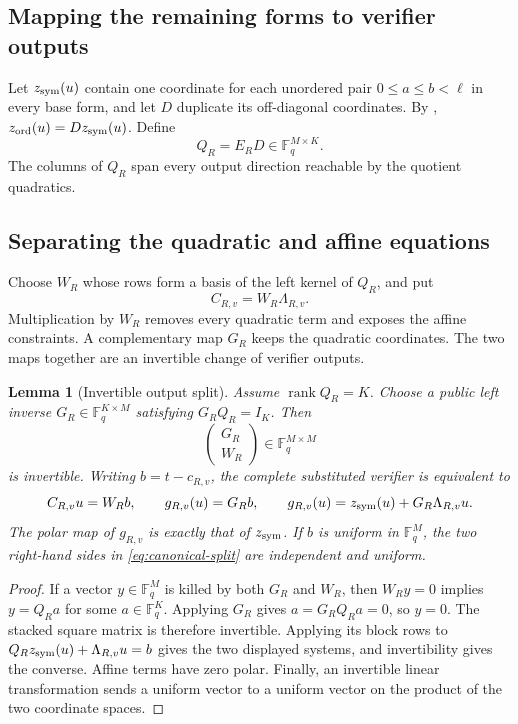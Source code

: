 \documentclass[11pt]{article}
\newtheorem{lemma}[lemma]{Lemma}
\newcommand{\F}{\mathbb F}
\newcommand{\rank}{\operatorname{rank}}
\begin{document}
\subsection{Mapping the remaining forms to verifier outputs}
Let $z_{\rm sym}(u)$ contain one coordinate for each unordered pair
$0\le a\le b<\ell$ in every base form, and let $D$ duplicate its off-diagonal
coordinates.  By ,
$z_{\rm ord}(u)=Dz_{\rm sym}(u)$.  Define
\begin{equation}
  Q_R=E_RD\in\F_q^{M\times K}.                     \label{eq:QR}
\end{equation}
The columns of $Q_R$ span every output direction reachable by the quotient
quadratics.

\subsection{Separating the quadratic and affine equations}
Choose $W_R$ whose rows form a basis of the left kernel of $Q_R$, and put
\begin{equation}
  C_{R,v}=W_R\Lambda_{R,v}.                          \label{eq:CRv}
\end{equation}
Multiplication by $W_R$ removes every quadratic term and exposes the affine
constraints.  A complementary map $G_R$ keeps the quadratic coordinates.
The two maps together are an invertible change of verifier outputs.

\begin{lemma}[Invertible output split]\label{lem:canonical-residual}
Assume $\rank Q_R=K$.  Choose a public left inverse
$G_R\in\F_q^{K\times M}$ satisfying $G_RQ_R=I_K$.  Then
\[
 \begin{pmatrix}G_R\\W_R\end{pmatrix}\in\F_q^{M\times M}
\]
is invertible.  Writing $b=t-c_{R,v}$, the complete substituted verifier is
equivalent to
\begin{equation}
 C_{R,v}u=W_Rb,
 \qquad
 g_{R,v}(u)=G_Rb,
 \qquad
 g_{R,v}(u)=z_{\rm sym}(u)+G_R\Lambda_{R,v}u.        \label{eq:canonical-split}
\end{equation}
The polar map of $g_{R,v}$ is exactly that of $z_{\rm sym}$.  If $b$ is
uniform in $\F_q^M$, the two right-hand sides in
\eqref{eq:canonical-split} are independent and uniform.
\end{lemma}

\begin{proof}
If a vector $y\in\F_q^M$ is killed by both $G_R$ and $W_R$, then
$W_Ry=0$ implies $y=Q_Ra$ for some $a\in\F_q^K$.  Applying $G_R$ gives
$a=G_RQ_Ra=0$, so $y=0$.  The stacked square matrix is therefore invertible.
Applying its block rows to
$Q_Rz_{\rm sym}(u)+\Lambda_{R,v}u=b$ gives the two displayed systems, and
invertibility gives the converse.  Affine terms have zero polar.  Finally, an
invertible linear transformation sends a uniform vector to a uniform vector
on the product of the two coordinate spaces.
\end{proof}
\end{document}
